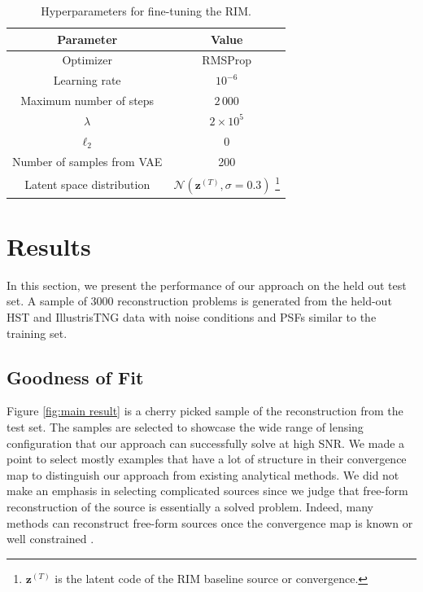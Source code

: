 \begin{table}[htb!]
        \centering
        \caption{Hyperparameters for fine-tuning the RIM.}
        \label{tab:fine-tuning hparams}
        \begin{tabular}{cc}
                Parameter & Value \\\hline\hline
                Optimizer & RMSProp \\
                Learning rate & $10^{-6}$\\
                Maximum number of steps & $2\,000$\\
                $\lambda$ & $2\times 10^{5}$\\
                $\ell_2$ & 0 \\
                Number of samples from VAE & 200 \\
                Latent space distribution & $\mathcal{N}(\mathbf{z}^{(T)}, \sigma=0.3)$
                \footnote{$\mathbf{z}^{(T)}$ is the latent code of the RIM baseline source or convergence.}\\
                \hline
        \end{tabular}
\end{table}


\section{Results}\label{sec:results}


In this section, we present the performance of our approach 
on the held out test set. A sample of 3000 reconstruction 
problems is generated from the held-out HST and IllustrisTNG data 
with noise conditions and PSFs similar to the training set.

\subsection{Goodness of Fit}
Figure \ref{fig:main result} is a cherry picked sample of the reconstruction from the test set. 
The samples are selected to showcase the wide range of lensing configuration that 
our approach can successfully solve at high SNR. We made a point to select mostly 
examples that have a lot of structure in their convergence map to distinguish 
our approach from existing analytical methods. We did not make an 
emphasis in selecting complicated sources since we judge that 
free-form reconstruction of the source is essentially a solved problem. 
Indeed, many methods can reconstruct free-form sources 
once the convergence map is known or well constrained 
\citep{Warren2003,Suyu2006,Vegetti2009,Birrer2018,Morningstar2019,Galan2021,Karchev2022,Mishra-Sharma2022}.

